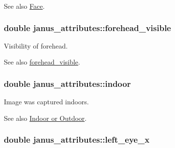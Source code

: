 \begin{DoxySeeAlso}{See also}
\hyperlink{group__janus_face}{Face}. 
\end{DoxySeeAlso}
\hypertarget{structjanus__attributes_a696065f9d8af60676c04f8bb4d5cdb08}{}
\subsubsection[{forehead\+\_\+visible}]{\setlength{\rightskip}{0pt plus 5cm}double janus\+\_\+attributes\+::forehead\+\_\+visible}\label{structjanus__attributes_a696065f9d8af60676c04f8bb4d5cdb08}


Visibility of forehead. 

\begin{DoxySeeAlso}{See also}
\hyperlink{structjanus__attributes_a696065f9d8af60676c04f8bb4d5cdb08}{forehead\+\_\+visible}. 
\end{DoxySeeAlso}
\hypertarget{structjanus__attributes_ad52579cc2667fea6e4e86f469a156791}{}
\subsubsection[{indoor}]{\setlength{\rightskip}{0pt plus 5cm}double janus\+\_\+attributes\+::indoor}\label{structjanus__attributes_ad52579cc2667fea6e4e86f469a156791}


Image was captured indoors. 

\begin{DoxySeeAlso}{See also}
\hyperlink{group__janus_indoor}{Indoor or Outdoor}. 
\end{DoxySeeAlso}
\hypertarget{structjanus__attributes_a043531c626035ccc2685f8d97c83de6a}{}
\subsubsection[{left\+\_\+eye\+\_\+x}]{\setlength{\rightskip}{0pt plus 5cm}double janus\+\_\+attributes\+::left\+\_\+eye\+\_\+x}\label{structjanus__attributes_a043531c626035ccc2685f8d97c83de6a}


